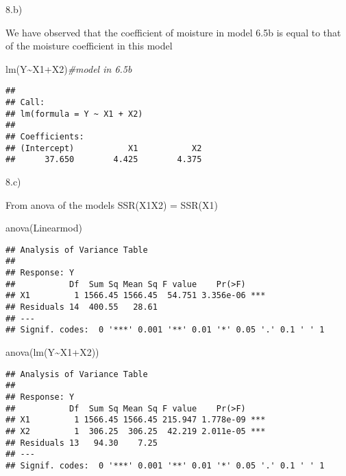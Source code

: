\documentclass[
]{article}
\newenvironment{Shaded}{\begin{snugshade}}{\end{snugshade}}
\newcommand{\CommentTok}[1]{\textcolor[rgb]{0.56,0.35,0.01}{\textit{#1}}}
\newcommand{\FunctionTok}[1]{\textcolor[rgb]{0.00,0.00,0.00}{#1}}
\newcommand{\NormalTok}[1]{#1}
\newcommand{\SpecialCharTok}[1]{\textcolor[rgb]{0.00,0.00,0.00}{#1}}
\begin{document}
8.b)

We have observed that the coefficient of moisture in model 6.5b is equal
to that of the moisture coefficient in this model

\begin{Shaded}
\begin{Highlighting}[]
\FunctionTok{lm}\NormalTok{(Y}\SpecialCharTok{\textasciitilde{}}\NormalTok{X1}\SpecialCharTok{+}\NormalTok{X2)}\CommentTok{\#model in 6.5b}
\end{Highlighting}
\end{Shaded}

\begin{verbatim}
## 
## Call:
## lm(formula = Y ~ X1 + X2)
## 
## Coefficients:
## (Intercept)           X1           X2  
##      37.650        4.425        4.375
\end{verbatim}

8.c)

From anova of the models SSR(X1\textbar X2) = SSR(X1)

\begin{Shaded}
\begin{Highlighting}[]
\FunctionTok{anova}\NormalTok{(Linearmod)}
\end{Highlighting}
\end{Shaded}

\begin{verbatim}
## Analysis of Variance Table
## 
## Response: Y
##           Df  Sum Sq Mean Sq F value    Pr(>F)    
## X1         1 1566.45 1566.45  54.751 3.356e-06 ***
## Residuals 14  400.55   28.61                      
## ---
## Signif. codes:  0 '***' 0.001 '**' 0.01 '*' 0.05 '.' 0.1 ' ' 1
\end{verbatim}

\begin{Shaded}
\begin{Highlighting}[]
\FunctionTok{anova}\NormalTok{(}\FunctionTok{lm}\NormalTok{(Y}\SpecialCharTok{\textasciitilde{}}\NormalTok{X1}\SpecialCharTok{+}\NormalTok{X2))}
\end{Highlighting}
\end{Shaded}

\begin{verbatim}
## Analysis of Variance Table
## 
## Response: Y
##           Df  Sum Sq Mean Sq F value    Pr(>F)    
## X1         1 1566.45 1566.45 215.947 1.778e-09 ***
## X2         1  306.25  306.25  42.219 2.011e-05 ***
## Residuals 13   94.30    7.25                      
## ---
## Signif. codes:  0 '***' 0.001 '**' 0.01 '*' 0.05 '.' 0.1 ' ' 1
\end{verbatim}
\end{document}
